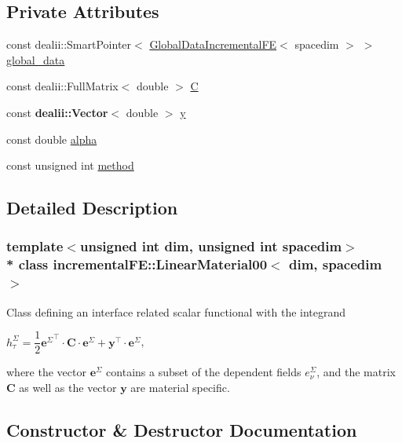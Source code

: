 \subsection*{Private Attributes}
\begin{DoxyCompactItemize}
\item 
const dealii\+::\+Smart\+Pointer$<$ \hyperlink{classincremental_f_e_1_1_global_data_incremental_f_e}{Global\+Data\+Incremental\+FE}$<$ spacedim $>$ $>$ \hyperlink{classincremental_f_e_1_1_linear_material00_adc2fce8d6428b316b1b5a6245fc93629}{global\+\_\+data}
\item 
const dealii\+::\+Full\+Matrix$<$ double $>$ \hyperlink{classincremental_f_e_1_1_linear_material00_ab1be4c9977c7d6671c5893dbfeb21078}{C}
\item 
const {\bf dealii\+::\+Vector}$<$ double $>$ \hyperlink{classincremental_f_e_1_1_linear_material00_a4b080a85b2d860bfaadbd1480cb9a69b}{y}
\item 
const double \hyperlink{classincremental_f_e_1_1_linear_material00_a81a2c21ea6ca1e039fc4991a2db64cfe}{alpha}
\item 
const unsigned int \hyperlink{classincremental_f_e_1_1_linear_material00_abc882081c652f94f40a24eb47da078fa}{method}
\end{DoxyCompactItemize}


\subsection{Detailed Description}
\subsubsection*{template$<$unsigned int dim, unsigned int spacedim$>$\\*
class incremental\+F\+E\+::\+Linear\+Material00$<$ dim, spacedim $>$}

Class defining an interface related scalar functional with the integrand

$h^\Sigma_\tau = \dfrac{1}{2} {\boldsymbol{e}^\Sigma}^\top \cdot \boldsymbol{C} \cdot \boldsymbol{e}^\Sigma + \boldsymbol{y}^\top \cdot \boldsymbol{e}^\Sigma$,

where the vector $\boldsymbol{e}^\Sigma$ contains a subset of the dependent fields $e^\Sigma_\nu$, and the matrix $\boldsymbol{C}$ as well as the vector $\boldsymbol{y}$ are material specific. 

\subsection{Constructor \& Destructor Documentation}
